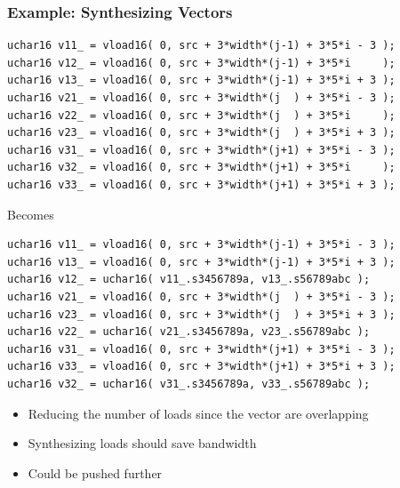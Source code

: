 \documentclass{beamer}
\begin{document}
\begin{frame}[fragile]
  \frametitle{Example: Synthesizing Vectors}
\lstset{style=BC}
\begin{lstlisting}
uchar16 v11_ = vload16( 0, src + 3*width*(j-1) + 3*5*i - 3 );
uchar16 v12_ = vload16( 0, src + 3*width*(j-1) + 3*5*i     );
uchar16 v13_ = vload16( 0, src + 3*width*(j-1) + 3*5*i + 3 );
uchar16 v21_ = vload16( 0, src + 3*width*(j  ) + 3*5*i - 3 );
uchar16 v22_ = vload16( 0, src + 3*width*(j  ) + 3*5*i     );
uchar16 v23_ = vload16( 0, src + 3*width*(j  ) + 3*5*i + 3 );
uchar16 v31_ = vload16( 0, src + 3*width*(j+1) + 3*5*i - 3 );
uchar16 v32_ = vload16( 0, src + 3*width*(j+1) + 3*5*i     );
uchar16 v33_ = vload16( 0, src + 3*width*(j+1) + 3*5*i + 3 );
\end{lstlisting}
\centering Becomes
\begin{lstlisting}
uchar16 v11_ = vload16( 0, src + 3*width*(j-1) + 3*5*i - 3 );
uchar16 v13_ = vload16( 0, src + 3*width*(j-1) + 3*5*i + 3 );
uchar16 v12_ = uchar16( v11_.s3456789a, v13_.s56789abc );
uchar16 v21_ = vload16( 0, src + 3*width*(j  ) + 3*5*i - 3 );
uchar16 v23_ = vload16( 0, src + 3*width*(j  ) + 3*5*i + 3 );
uchar16 v22_ = uchar16( v21_.s3456789a, v23_.s56789abc );
uchar16 v31_ = vload16( 0, src + 3*width*(j+1) + 3*5*i - 3 );
uchar16 v33_ = vload16( 0, src + 3*width*(j+1) + 3*5*i + 3 );
uchar16 v32_ = uchar16( v31_.s3456789a, v33_.s56789abc );
\end{lstlisting}
\begin{itemize}
\item Reducing the number of loads since the vector are overlapping
\item Synthesizing loads should save bandwidth
\item Could be pushed further
\end{itemize}
\end{frame}
\end{document}
